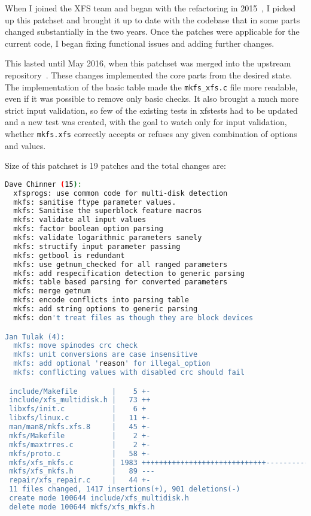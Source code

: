 When I joined the XFS team and began with the refactoring in
2015~\cite{myFirstPatches}, I picked up this patchset and brought it up to
date with the codebase that in some parts changed substantially in the two
years. Once the patches were applicable for the current code, I began
fixing functional issues and adding further changes.


This lasted until May 2016, when this patchset was merged into the upstream
repository~\cite{finalPatchset1,finalPatchset1Announce}.
These changes implemented the core parts from the desired state. The
implementation of the basic table made the {\tt mkfs\_xfs.c} file more
readable, even if it was possible to remove only basic checks. It also
brought a much more strict input validation, so few of the existing tests
in xfstests had to be updated and a new test was created, with the goal to
watch only for input validation, whether {\tt mkfs.xfs} correctly accepts
or refuses any given combination of options and values.

Size of this patchset is 19 patches and the total changes are:
\begin{lstlisting}[frame=none, basicstyle=\footnotesize\ttfamily, language=Bash, numbers=none, numberstyle=\tiny\color{black},caption= {Git statistics for the first patchset~\cite{finalPatchset1}. Note: Git attributes changes only to the first author of each commit.}]
Dave Chinner (15):
  xfsprogs: use common code for multi-disk detection
  mkfs: sanitise ftype parameter values.
  mkfs: Sanitise the superblock feature macros
  mkfs: validate all input values
  mkfs: factor boolean option parsing
  mkfs: validate logarithmic parameters sanely
  mkfs: structify input parameter passing
  mkfs: getbool is redundant
  mkfs: use getnum_checked for all ranged parameters
  mkfs: add respecification detection to generic parsing
  mkfs: table based parsing for converted parameters
  mkfs: merge getnum
  mkfs: encode conflicts into parsing table
  mkfs: add string options to generic parsing
  mkfs: don't treat files as though they are block devices

Jan Tulak (4):
  mkfs: move spinodes crc check
  mkfs: unit conversions are case insensitive
  mkfs: add optional 'reason' for illegal_option
  mkfs: conflicting values with disabled crc should fail

 include/Makefile        |    5 +-
 include/xfs_multidisk.h |   73 ++
 libxfs/init.c           |    6 +
 libxfs/linux.c          |   11 +-
 man/man8/mkfs.xfs.8     |   45 +-
 mkfs/Makefile           |    2 +-
 mkfs/maxtrres.c         |    2 +-
 mkfs/proto.c            |   58 +-
 mkfs/xfs_mkfs.c         | 1983 +++++++++++++++++++++++++++++------------------
 mkfs/xfs_mkfs.h         |   89 ---
 repair/xfs_repair.c     |   44 +-
 11 files changed, 1417 insertions(+), 901 deletions(-)
 create mode 100644 include/xfs_multidisk.h
 delete mode 100644 mkfs/xfs_mkfs.h
\end{lstlisting}

